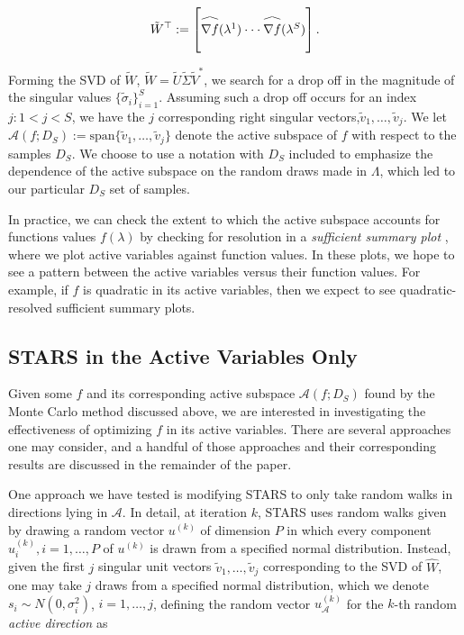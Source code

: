 \documentclass{amsart}
\newcommand{\A}{\mathcal{A}}
\newcommand\reallywidehat[1]{\arraycolsep=0pt\relax%
\begin{array}{c}
\stretchto{
  \scaleto{
    \scalerel*[\widthof{\ensuremath{#1}}]{\kern-.5pt\bigwedge\kern-.5pt}
    {\rule[-\textheight/2]{1ex}{\textheight}} %
  }{\textheight} %
}{0.5ex}\\           %
#1\\                 %
\rule{-1ex}{0ex}
\end{array}
}
\begin{document}
\begin{equation} \label{eq:10}
\tilde{W}^\top:=\begin{bmatrix}
\reallywidehat{\nabla f}(\lambda^1)
\cdot \cdot \cdot
\reallywidehat{\nabla f}(\lambda^S)\\
\end{bmatrix}.
\end{equation}  

Forming the SVD of $\tilde{W}$, $\tilde{W}=\tilde{U}\tilde{\Sigma}\tilde{V}^*$, we search for a drop off in the magnitude of the singular values $\{\tilde{\sigma}_i\}_{i=1}^S$. Assuming such a drop off occurs for an index $j:1<j<S$, we have the $j$ corresponding right singular vectors,$ \tilde{v}_1,\ldots,\tilde{v}_{j}$.  We let $\A\left(f; D_S \right):=\text{span}\{\tilde{v}_1,\ldots,\tilde{v}_{j}\}$ denote the active subspace of $f$ with respect to the samples $D_S$. We choose to use a notation with $D_S$ included to emphasize the dependence of the active subspace on the random draws made in $\Lambda$, which led to our particular $D_S$ set of samples.

In practice, we can check the extent to which the active subspace accounts for functions values $f(\lambda)$ 
by checking for resolution in a \emph{sufficient summary plot} \cite{Constantine2015}, where we plot active variables against function values. In these plots, we hope to see a pattern between the active variables versus their function values. For example, if $f$ is quadratic in its active variables, then we expect to see quadratic-resolved sufficient summary plots.











\subsection{STARS in the Active Variables Only} Given some $f$ and its corresponding active subspace $\A(f;D_S)$ found by the Monte Carlo method discussed above, we are interested in investigating the effectiveness of optimizing $f$ in its active variables. There are several approaches one may consider, and a handful of those approaches and their corresponding results are discussed in the remainder of the paper. 

One approach we have tested is modifying STARS to only take random walks in directions lying in $\A$. In detail, at iteration $k$, STARS uses random walks given by drawing a random vector $u^{(k)}$ of dimension $P$ in which every component $u_i^{(k)},i=1,\ldots,P$ of $u^{(k)}$ is  drawn from a specified normal distribution. Instead, given the first $j$ singular unit vectors $\tilde{v}_1,\ldots,\tilde{v}_j$ corresponding to the SVD of $\hat{W}$, one may take $j$ draws from a specified normal distribution, which we denote $s_i\sim N(0,\sigma_i^2)$, $i=1,\ldots,j$, defining the random vector $u_\A^{(k)}$ for the $k$-th random \textit{active direction} as 
\end{document}
